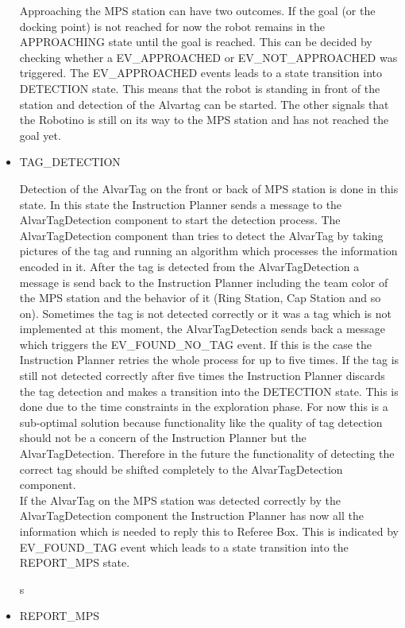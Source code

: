 \begin{itemize}
Approaching the MPS station can have two outcomes. If the goal (or the docking point) is not reached for now the robot remains in the APPROACHING state until the goal is reached. This can be decided by checking whether a EV\_APPROACHED or EV\_NOT\_APPROACHED was triggered. The EV\_APPROACHED events leads to a state transition into DETECTION state. This means that the robot is standing in front of the station and detection of the Alvartag can be started. The other signals that the Robotino is still on its way to the MPS station and has not reached the goal yet.  


\item TAG\_DETECTION

Detection of the AlvarTag on the front or back of MPS station is done in this state. In this state the Instruction Planner sends a message to the AlvarTagDetection component to start the detection process. The AlvarTagDetection component than tries to detect the AlvarTag by taking pictures of the tag and running an algorithm which processes the information encoded in it. After the tag is detected from the AlvarTagDetection a message is send back to the Instruction Planner including the team color of the MPS station and the behavior of it (Ring Station, Cap Station and so on). Sometimes the tag is not detected correctly or it was a tag which is not implemented at this moment, the AlvarTagDetection sends back a message which triggers the EV\_FOUND\_NO\_TAG event. If this is the case the Instruction Planner retries the whole process for up to five times. If the tag is still not detected correctly after five times the Instruction Planner discards the tag detection and makes a transition into the DETECTION state. This is done due to the time constraints in the exploration phase. For now this is a sub-optimal solution because functionality like the quality of tag detection should not be a concern of the Instruction Planner but the AlvarTagDetection. Therefore in the future the functionality of detecting the correct tag should be shifted completely to the AlvarTagDetection component. \\

If the AlvarTag on the MPS station was detected correctly by the AlvarTagDetection component the Instruction Planner has now all the information which is needed to reply this to Referee Box. This is indicated by EV\_FOUND\_TAG event which leads to a state transition into the REPORT\_MPS state.

s
\item REPORT\_MPS


\end{itemize}
